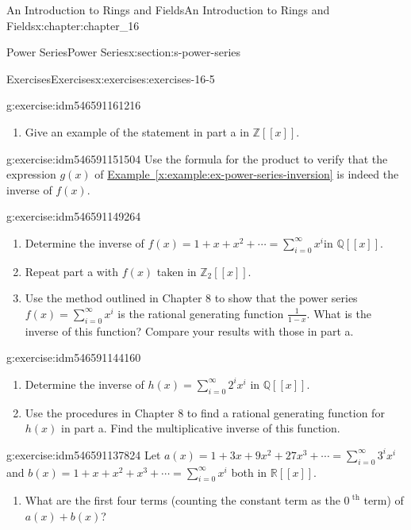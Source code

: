 \documentclass[oneside,10pt,]{book}
\newcommand{\xreffont}{\relax}
\numberwithin{equation}{section}
\begin{document}
\begin{chapterptx}{An Introduction to Rings and Fields}{}{An Introduction to Rings and Fields}{}{}{x:chapter:chapter_16}
\begin{sectionptx}{Power Series}{}{Power Series}{}{}{x:section:s-power-series}
\begin{exercises-subsection}{Exercises}{}{Exercises}{}{}{x:exercises:exercises-16-5}
\begin{divisionexercise}{2}{}{}{g:exercise:idm546591161216}
\begin{enumerate}[label=(\alph*)]
\item{}Give an example of the statement in part a in \(\mathbb{Z}[[x]]\).%
\end{enumerate}
%
\end{divisionexercise}%
\begin{divisionexercise}{3}{}{}{g:exercise:idm546591151504}%
Use the formula for the product to verify that the expression \(g(x)\) of \hyperref[x:example:ex-power-series-inversion]{Example~{\xreffont\ref{x:example:ex-power-series-inversion}}} is indeed the inverse of \(f(x)\).%
\end{divisionexercise}%
\begin{divisionexercise}{4}{}{}{g:exercise:idm546591149264}%
%
\begin{enumerate}[label=(\alph*)]
\item{}Determine the inverse of \(f(x) = 1 + x + x^2 + \cdots  = \sum_{i=0}^{\infty } x^i\)in \(\mathbb{Q}[[x]]\).%
\item{}Repeat part a with \(f(x)\) taken in \(\mathbb{Z}_2[[x]]\).%
\item{}Use the method outlined in Chapter 8 to show that the power series \(f(x) = \sum_{i=0}^{\infty } x^i\) is the rational generating function \(\frac{1}{1-x}\). What is the inverse of this function? Compare your results with those in part a.%
\end{enumerate}
%
\end{divisionexercise}%
\begin{divisionexercise}{5}{}{}{g:exercise:idm546591144160}%
%
\begin{enumerate}[label=(\alph*)]
\item{}Determine the inverse of \(h(x) = \sum_{i=0}^{\infty } 2^i x^i\)  in \(\mathbb{Q}[[x]]\).%
\item{}Use the procedures in Chapter 8 to find a rational generating function for \(h(x)\) in part a.  Find the multiplicative inverse of this function.%
\end{enumerate}
%
\end{divisionexercise}%
\begin{divisionexercise}{6}{}{}{g:exercise:idm546591137824}%
Let \(a(x) = 1 + 3x + 9x^2 + 27x^3 + \cdots =\sum_{i=0}^{\infty } 3^i x^i\) and \(b(x) = 1 + x + x^2+ x^3+\cdots =\sum_{i=0}^{\infty }  x^i\) both in \(\mathbb{R}[[x]]\).%
\begin{enumerate}[label=(\alph*)]
\item{}What are the first four terms (counting the constant term as the \(0^{\textrm{ th}}\) term) of \(a(x) + b(x)\)?%

\end{enumerate}
\end{divisionexercise}
\end{exercises-subsection}
\end{sectionptx}
\end{chapterptx}
\end{document}
